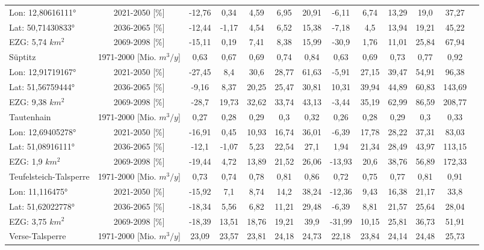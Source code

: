 \begin{longtable}{@{\extracolsep{\fill}}lc|ccccc||cccccc}
\cline{2-13} 
Lon: 12,80616111° & 2021-2050 [\%]  & -12,76 & 0,34 & 4,59 & 6,95 & 20,91 & -6,11 & 6,74 & 13,29 & 19,0 & 37,27 & \\ 
Lat: 50,71430833° & 2036-2065 [\%]  & -12,44 & -1,17 & 4,54 & 6,52 & 15,38 & -7,18 & 4,5 & 13,94 & 19,21 & 45,22 & \\ 
EZG: 5,74 $km^2$ & 2069-2098 [\%]  & -15,11 & 0,19 & 7,41 & 8,38 & 15,99 & -30,9 & 1,76 & 11,01 & 25,84 & 67,94 & \\ 
\hline 
Süptitz & 1971-2000 [Mio. $m^3/y$]  & 0,63 & 0,67 & 0,69 & 0,74 & 0,84 & 0,63 & 0,69 & 0,73 & 0,77 & 0,92 & \\ 
\cline{2-13} 
Lon: 12,91719167° & 2021-2050 [\%]  & -27,45 & 8,4 & 30,6 & 28,77 & 61,63 & -5,91 & 27,15 & 39,47 & 54,91 & 96,38 & \\ 
Lat: 51,56759444° & 2036-2065 [\%]  & -9,16 & 8,37 & 20,25 & 25,47 & 30,81 & 10,31 & 39,94 & 44,89 & 60,83 & 143,69 & \\ 
EZG: 9,38 $km^2$ & 2069-2098 [\%]  & -28,7 & 19,73 & 32,62 & 33,74 & 43,13 & -3,44 & 35,19 & 62,99 & 86,59 & 208,77 & \\ 
\hline 
Tautenhain & 1971-2000 [Mio. $m^3/y$]  & 0,27 & 0,28 & 0,29 & 0,3 & 0,32 & 0,26 & 0,28 & 0,29 & 0,3 & 0,33 & \\ 
\cline{2-13} 
Lon: 12,69405278° & 2021-2050 [\%]  & -16,91 & 0,45 & 10,93 & 16,74 & 36,01 & -6,39 & 17,78 & 28,22 & 37,31 & 83,03 & \\ 
Lat: 51,08916111° & 2036-2065 [\%]  & -12,1 & -1,07 & 5,23 & 22,54 & 27,1 & 1,94 & 21,34 & 28,49 & 43,97 & 113,15 & \\ 
EZG: 1,9 $km^2$ & 2069-2098 [\%]  & -19,44 & 4,72 & 13,89 & 21,52 & 26,06 & -13,93 & 20,6 & 38,76 & 56,89 & 172,33 & \\ 
\hline 
Teufelsteich-Talsperre & 1971-2000 [Mio. $m^3/y$]  & 0,73 & 0,74 & 0,78 & 0,81 & 0,86 & 0,72 & 0,75 & 0,77 & 0,81 & 0,91 & \\ 
\cline{2-13} 
Lon: 11,116475° & 2021-2050 [\%]  & -15,92 & 7,1 & 8,74 & 14,2 & 38,24 & -12,36 & 9,43 & 16,38 & 21,17 & 33,8 & \\ 
Lat: 51,62022778° & 2036-2065 [\%]  & -18,34 & 5,56 & 6,82 & 11,21 & 29,48 & -6,39 & 8,81 & 21,57 & 25,64 & 28,04 & \\ 
EZG: 3,75 $km^2$ & 2069-2098 [\%]  & -18,39 & 13,51 & 18,76 & 19,21 & 39,9 & -31,99 & 10,15 & 25,81 & 36,73 & 51,91 & \\ 
\hline 
Verse-Talsperre & 1971-2000 [Mio. $m^3/y$]  & 23,09 & 23,57 & 23,81 & 24,18 & 24,73 & 22,18 & 23,84 & 24,14 & 24,48 & 25,73 & \\ 

\end{longtable}
